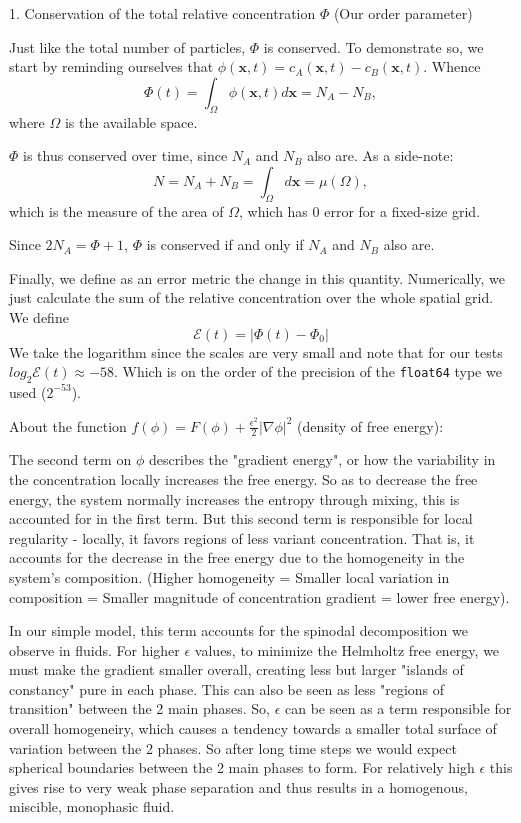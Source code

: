 \documentclass{article}
\begin{document}
1. Conservation of the total relative concentration $\Phi$ (Our order parameter)

Just like the total number of particles, $\Phi$ is conserved.
To demonstrate so, we start by reminding ourselves that $\phi(\mathbf{x},t) = c_A(\mathbf{x},t)-c_B(\mathbf{x},t)$.
Whence \[ \Phi(t) = \int_{\Omega} \phi(\mathbf{x},t)d\mathbf{x} = N_A - N_B, \]
where $\Omega$ is the available space.

$\Phi$ is thus conserved over time, since $N_A$ and $N_B$ also are.
As a side-note: \[ N = N_A + N_B = \int_{\Omega} d\mathbf{x} = \mu(\Omega), \]
which is the measure of the area of $\Omega$, which has 0 error for a fixed-size grid.

Since $2N_A = \Phi+1$, $\Phi$ is conserved if and only if $N_A$ and $N_B$ also are.

Finally, we define as an error metric the change in this quantity.
Numerically, we just calculate the sum of the relative concentration over the whole spatial grid.
We define
\[ \mathcal{E}(t) = |\Phi(t) - \Phi_0| \]
We take the logarithm since the scales are very small and note that for our tests $log_{2}\mathcal{E}(t) \approx -58$.
Which is on the order of the precision of the \verb`float64` type we used ($2^{-53}$).

About the function $f(\phi) = F(\phi) + \frac{\epsilon^2}{2}|\nabla{\phi}|^2$ (density of free energy):

The second term on $\phi$ describes the "gradient energy", or how the variability in the concentration locally increases the free energy.
So as to decrease the free energy, the system normally increases the entropy through mixing, this is accounted for in the first term.
But this second term is responsible for local regularity - locally, it favors regions of less variant concentration.
That is, it accounts for the decrease in the free energy due to the homogeneity in the system's composition.
(Higher homogeneity = Smaller local variation in composition = Smaller magnitude of concentration gradient = lower free energy).

In our simple model, this term accounts for the spinodal decomposition we observe in fluids.
For higher $\epsilon$ values, to minimize the Helmholtz free energy, we must make the gradient smaller overall, creating less but larger "islands of constancy" pure in each phase.
This can also be seen as less "regions of transition" between the 2 main phases.
So, $\epsilon$ can be seen as a term responsible for overall homogeneiry, which causes a tendency towards a smaller total surface of variation between the 2 phases.
So after long time steps we would expect spherical boundaries between the 2 main phases to form.
For relatively high $\epsilon$ this gives rise to very weak phase separation and thus results in a homogenous, miscible, monophasic fluid.
\end{document}
